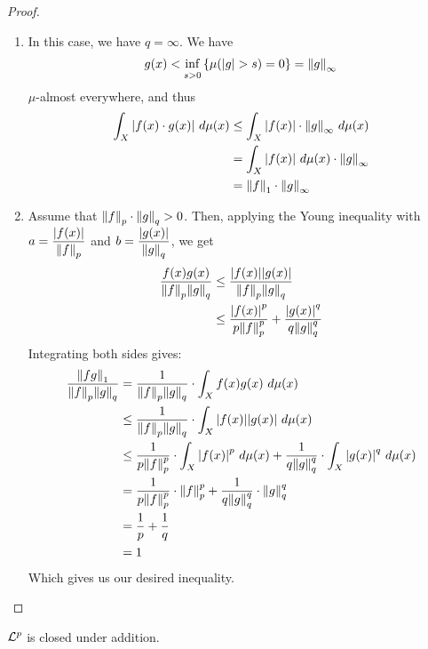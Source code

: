 \begin{proof}
	\phantom{}
	\begin{enumerate}
		\item[$p = 1$:]
		In this case, we have $q = \infty$. We have
		\begin{align*}
			g(x) < \inf_{s > 0} \lr{\mu(\abs{g} > s) = 0} = \norm{g}_\infty
		\end{align*}
		$\mu$-almost everywhere, and thus
		\begin{align*}
			\int_X \abs{f(x) \cdot g(x)} ~d\mu(x)
			&\leq
			\int_X \abs{f(x)} \cdot \norm{g}_\infty ~d\mu(x)\\
			&=
			\int_X \abs{f(x)} ~d\mu(x) \cdot \norm{g}_\infty\\
			&=
			\norm{f}_1 \cdot \norm{g}_\infty
		\end{align*}
		
		\item[$p > 1$:] Assume that $\norm{f}_p \cdot \norm{g}_q > 0$. Then, applying the Young inequality with $\displaystyle a = \frac{\abs{f(x)}}{\norm{f}_p}$ and $\displaystyle b = \frac{\abs{g(x)}}{\norm{g}_q}$, we get
		\begin{align*}
			\frac{f(x)g(x)}{\norm{f}_p\norm{g}_q}
			&\leq
			\frac{\abs{f(x)}\abs{g(x)}}{\norm{f}_p\norm{g}_q}\\
			&\leq
			\frac{\abs{f(x)}^p}{p\norm{f}_p^p}
			+
			\frac{\abs{g(x)}^q}{q\norm{g}_q^q}
		\end{align*}
		Integrating both sides gives:
		\begin{align*}
			\frac{\norm{fg}_1}{\norm{f}_p \norm{g}_q}
			&=
			\frac{1}{\norm{f}_p\norm{g}_q} \cdot \int_X f(x)g(x) ~d\mu(x)\\
			&\leq			
			\frac{1}{\norm{f}_p\norm{g}_q} \cdot \int_X \abs{f(x)}\abs{g(x)} ~d\mu(x)\\	
			&\leq 
			\frac{1}{p\norm{f}_p^p} \cdot \int_X \abs{f(x)}^p ~d\mu(x)
			+
			\frac{1}{q\norm{g}_q^q} \cdot \int_X \abs{g(x)}^q ~d\mu(x)\\
			&=
			\frac{1}{p\norm{f}_p^p} \cdot \norm{f}_p^p
			+
			\frac{1}{q\norm{g}_q^q} \cdot \norm{g}_q^q\\
			&= \frac{1}{p} + \frac{1}{q}\\
			&= 1
		\end{align*}
		Which gives us our desired inequality.
	\end{enumerate}
\end{proof}
\begin{lemma}
	$\mathcal{L}^p$ is closed under addition.
\end{lemma}
